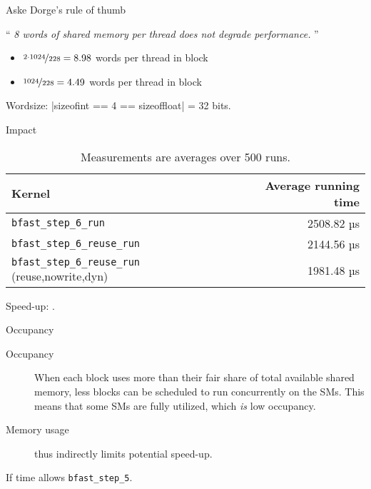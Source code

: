 \begin{frame}[fragile]{Aske Dorge's rule of thumb}

\footnotesize \enquote{
    \textit{
       8 words of shared memory per thread does not degrade performance. 
    }
}
\pause

\begin{itemize}
    \item \(\nicefrac{2\cdot 1024}{228} = 8.98\) words per thread in block
    \item \(\nicefrac{1024}{228} = 4.49\) words per thread in block
\end{itemize}

\pause
Wordsize: |sizeof{int} == 4 == sizeof{float}| = 32 bits.


\end{frame}

\begin{frame}[fragile]{Impact}

    \begin{table}
        \centering
        \begin{tabular}{l r}
            \textbf{Kernel} & \textbf{Average running time} \\ \hline
          \footnotesize  \texttt{bfast\_step\_6\_run} &    2508.82  µs \\
          \footnotesize   \texttt{bfast\_step\_6\_reuse\_run}  & 2144.56  µs \\
          \footnotesize \texttt{bfast\_step\_6\_reuse\_run} (reuse,nowrite,dyn) &  1981.48 µs
        \end{tabular}
        \caption{Measurements are averages over 500 runs.}
       \label{tab:noreuse}
    \end{table}

    \pause

    Speed-up:  \times.
        
    

\end{frame}



\begin{frame}[fragile]{Occupancy}

    \begin{description}
        \item [Occupancy] When each block uses more than their fair share of
            total available shared memory, less blocks can be scheduled to run
            concurrently on the SMs. This means that some SMs are fully utilized, which \textit{is} low occupancy.
        \item [Memory usage] thus indirectly limits potential speed-up.
    \end{description}


    \pause

    If time allows \texttt{bfast\_step\_5}.
\end{frame}



